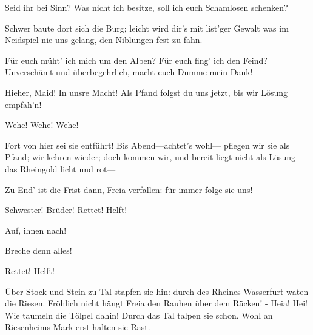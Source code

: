 \begin{drama}
\Wotanspeaks
Seid ihr bei Sinn?
Was nicht ich besitze,
soll ich euch Schamlosen schenken?
 

\Fafnerspeaks
Schwer baute dort sich die Burg;
leicht wird dir's mit list'ger Gewalt
was im Neidspiel nie uns gelang,
den Niblungen fest zu fahn.
 

\Wotanspeaks
Für euch müht' ich mich um den Alben?
Für euch fing' ich den Feind?
Unverschämt und überbegehrlich,
macht euch Dumme mein Dank!
 

\Fasoltspeaks


Hieher, Maid! In unsre Macht!
Als Pfand folgst du uns jetzt,
bis wir Lösung empfah'n!
 

\Freiaspeaks


Wehe! Wehe! Wehe!
 




\Fafnerspeaks
Fort von hier sei sie entführt!
Bis Abend---achtet's wohl---
pflegen wir sie als Pfand;
wir kehren wieder; doch kommen wir,
und bereit liegt nicht als Lösung
das Rheingold licht und rot---
 

\Fasoltspeaks
Zu End' ist die Frist dann,
Freia verfallen:
für immer folge sie uns!
 

\Freiaspeaks


Schwester! Brüder! Rettet! Helft!
 




\Frohspeaks
Auf, ihnen nach!
 

\Donnerspeaks
Breche denn alles!
 




\Freiaspeaks


Rettet! Helft!
 

\Logespeaks


Über Stock und Stein zu Tal
stapfen sie hin:
durch des Rheines Wasserfurt
waten die Riesen.
Fröhlich nicht hängt Freia
den Rauhen über dem Rücken! -
Heia! Hei! Wie taumeln die Tölpel dahin!
Durch das Tal talpen sie schon.
Wohl an Riesenheims Mark
erst halten sie Rast. -
 



\end{drama}
